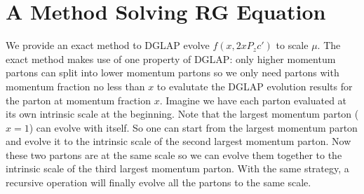 \documentclass[prd,aps,twocolumn,preprintnumbers, showpacs, nofootinbib,superscriptaddress,notitlepage]{revtex4-2}
\begin{document}

\section{A Method Solving RG Equation}\label{app:exactscalemethod}

We provide an exact method to DGLAP evolve $f(x,2 x P_z c')$ to scale $\mu$. The exact method makes use of one property of DGLAP: only higher momentum partons can split into lower momentum partons so we only need partons with momentum fraction no less than $x$ to evalutate the DGLAP evolution results for the parton at momentum fraction $x$. Imagine we have each parton evaluated at its own intrinsic scale at the beginning. Note that the largest momentum parton ($x=1$) can evolve with itself. So one can start from the largest momentum parton and evolve it to the intrinsic scale of the second largest momentum parton. Now these two partons are at the same scale so we can evolve them together to the intrinsic scale of the third largest momentum parton. With the same strategy, a recursive operation will finally evolve all the partons to the same scale.
\end{document}
